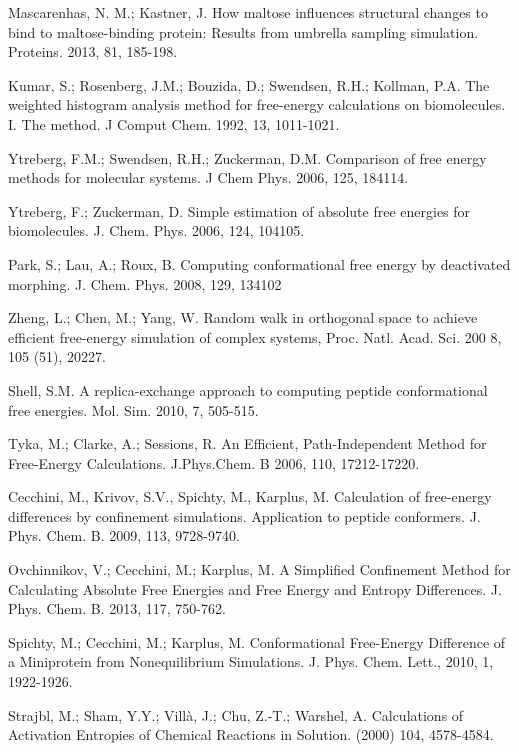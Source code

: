 \documentclass[12pt]{article}
\begin{document}
\begin{thebibliography}{99}
Mascarenhas, N. M.; Kastner, J. How maltose influences structural changes to bind to maltose-binding protein: Results from umbrella sampling simulation. Proteins. 2013, 81, 185-198.

Kumar, S.; Rosenberg, J.M.; Bouzida, D.; Swendsen, R.H.; Kollman, P.A. The weighted histogram analysis method for free-energy calculations on biomolecules. I. The 
method. J Comput Chem. 1992, 13, 1011-1021.


Ytreberg, F.M.; Swendsen, R.H.; Zuckerman, D.M. Comparison of free energy methods for molecular systems. J Chem Phys. 2006, 125, 184114.

Ytreberg, F.; Zuckerman, D. Simple estimation of absolute free energies for biomolecules. J. Chem. Phys. 2006, 124, 104105.

Park, S.; Lau, A.; Roux, B. Computing conformational free energy by deactivated morphing. J. Chem. Phys. 2008, 129, 134102

Zheng, L.; Chen, M.; Yang, W. Random walk in orthogonal space to achieve efficient free-energy simulation of complex systems, Proc. Natl. Acad. Sci. 200
8, 105 (51), 20227.

Shell, S.M. A replica-exchange approach to computing peptide conformational free energies. Mol. Sim. 2010, 7, 505-515.

Tyka, M.; Clarke, A.; Sessions, R. An Efficient, Path-Independent Method for Free-Energy Calculations. J.Phys.Chem. B 2006, 110, 17212-17220.

Cecchini, M., Krivov, S.V., Spichty, M., Karplus, M. Calculation of free-energy differences by confinement simulations. Application to peptide conformers. J. Phys. Chem. B. 2009, 113, 9728-9740.

Ovchinnikov, V.; Cecchini, M.; Karplus, M. A Simplified Confinement Method for Calculating Absolute Free Energies
and Free Energy and Entropy Differences. J. Phys. Chem. B. 2013, 117, 750-762.

Spichty, M.; Cecchini, M.; Karplus, M. Conformational Free-Energy Difference of a Miniprotein from Nonequilibrium
Simulations. J. Phys. Chem. Lett., 2010, 1, 1922-1926.

Strajbl, M.; Sham, Y.Y.; Villà, J.; Chu, Z.-T.; Warshel, A. Calculations of Activation Entropies of Chemical Reactions
in Solution. (2000) 104, 4578-4584.


\end{thebibliography}
\end{document}
